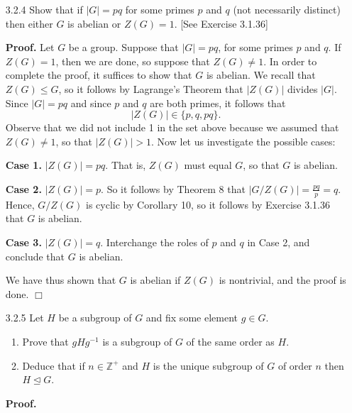 \documentclass[9pt]{article}
\newcommand{\qed}{\hfill \ensuremath{\Box}}
\newcommand{\Z}{\mathbb{Z}}
\begin{document}
\begin{enumerate}
   \item[3.2.4]   Show that if $|G| = pq$ for some primes $p$ and $q$ (not
                  necessarily distinct) then either $G$ is abelian or
                  $Z(G) = 1$. [See Exercise 3.1.36]

      \textbf{Proof.} Let $G$ be a group. Suppose that $|G| = pq$, for some
      primes $p$ and $q$. If $Z(G) = 1$, then we are done, so suppose that
      $Z(G) \neq 1$. In order to complete the proof, it suffices to show that
      $G$ is abelian. We recall that $Z(G) \le G$, so it follows by Lagrange's 
      Theorem that $|Z(G)|$ divides $|G|$. Since $|G| = pq$ and since $p$ and
      $q$ are both primes, it follows that
      $$|Z(G)| \in \{p, q, pq\}.$$
      Observe that we did not include 1 in the set above because we assumed that
      $Z(G) \neq 1$, so that $|Z(G)| > 1$. Now let us investigate the possible
      cases:

      \textbf{Case 1.} $|Z(G)| = pq$. That is, $Z(G)$ must equal $G$, so that
      $G$ is abelian.

      \textbf{Case 2.} $|Z(G)| = p$. So it follows by Theorem 8 that
      $|G/Z(G)| = \frac{pq}{p} = q$. Hence, $G/Z(G)$ is cyclic by Corollary 10, 
      so it follows by Exercise 3.1.36 that $G$ is abelian.

      \textbf{Case 3.} $|Z(G)| = q$. Interchange the roles of $p$ and $q$ in
      Case 2, and conclude that $G$ is abelian.

      We have thus shown that $G$ is abelian if $Z(G)$ is nontrivial, and the
      proof is done. \qed      
   \item[3.2.5]   Let $H$ be a subgroup of $G$ and fix some element $g \in G$.
                  \begin{enumerate}
                     \item Prove that $gHg^{-1}$ is a subgroup of $G$ of the
                           same order as $H$.
                     \item Deduce that if $n \in \Z^+$ and $H$ is the unique
                           subgroup of $G$ of order $n$ then
                           $H \trianglelefteq G$.
                  \end{enumerate}

      \textbf{Proof.}


\end{enumerate}
\end{document}
